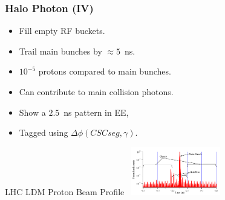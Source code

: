 \documentclass{beamer}
\begin{document}
\begin{frame}
\frametitle{Halo Photon (IV)}
 \begin{minipage}[t]{0.85\paperwidth}
    \begin{tcolorbox}[colback=UNL@Cream!5,colframe=UMN@Maroon!40,title=\textcolor{black}{ \textbf{Satellite/Ghost Beam Halos}}]
      \begin{itemize}
       \item Fill empty RF buckets.
       \item Trail main bunches by $\approx 5$~ns.
       \item $10^{-5}$ protons compared to main bunches.
       \item Can contribute to main collision photons.
       \item Show a $2.5$~ns pattern in EE,
       \item Tagged using $\Delta\phi(CSC seg, \gamma)$.
      \end{itemize} 
      \end{tcolorbox}
 \end{minipage}
 \begin{minipage}[t]{0.95\paperwidth}
    \centering
    \begin{varblock}[6cm]{LHC LDM Proton Beam Profile}
    \centering
    \mbox{
     \includegraphics[height=2.1cm,width=0.8\linewidth]{THESISPLOTS/Ghost-Satellite-Bunches-LDM.png} 
     }
     \end{varblock}  
 \end{minipage}
 
\end{frame}
\end{document}
